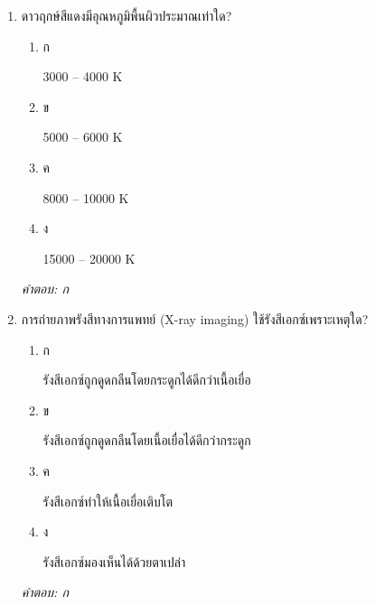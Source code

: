 \documentclass[12pt]{article}
\begin{document}
\begin{enumerate}[label=\arabic*., itemsep=0.5\baselineskip, topsep=0.5\baselineskip, leftmargin=*]
\item ดาวฤกษ์สีแดงมีอุณหภูมิพื้นผิวประมาณเท่าใด?
\begin{enumerate}[label=\alph*)., itemsep=0.3\baselineskip, topsep=0.3\baselineskip]
\item ก\ 
\begin{minipage}[t]{0.9\linewidth}
\raggedright 3000 – 4000 K
\end{minipage}
\item ข\ 
\begin{minipage}[t]{0.9\linewidth}
\raggedright 5000 – 6000 K
\end{minipage}
\item ค\ 
\begin{minipage}[t]{0.9\linewidth}
\raggedright 8000 – 10000 K
\end{minipage}
\item ง\ 
\begin{minipage}[t]{0.9\linewidth}
\raggedright 15000 – 20000 K
\end{minipage}
\end{enumerate}
\vspace{-0.3\baselineskip}
\begin{small}
\textit{คำตอบ: ก}
\end{small}

\item การถ่ายภาพรังสีทางการแพทย์ (X-ray imaging) ใช้รังสีเอกซ์เพราะเหตุใด?
\begin{enumerate}[label=\alph*)., itemsep=0.3\baselineskip, topsep=0.3\baselineskip]
\item ก\ 
\begin{minipage}[t]{0.9\linewidth}
\raggedright รังสีเอกซ์ถูกดูดกลืนโดยกระดูกได้ดีกว่าเนื้อเยื่อ
\end{minipage}
\item ข\ 
\begin{minipage}[t]{0.9\linewidth}
\raggedright รังสีเอกซ์ถูกดูดกลืนโดยเนื้อเยื่อได้ดีกว่ากระดูก
\end{minipage}
\item ค\ 
\begin{minipage}[t]{0.9\linewidth}
\raggedright รังสีเอกซ์ทำให้เนื้อเยื่อเติบโต
\end{minipage}
\item ง\ 
\begin{minipage}[t]{0.9\linewidth}
\raggedright รังสีเอกซ์มองเห็นได้ด้วยตาเปล่า
\end{minipage}
\end{enumerate}
\vspace{-0.3\baselineskip}
\begin{small}
\textit{คำตอบ: ก}
\end{small}


\end{enumerate}
\end{document}
